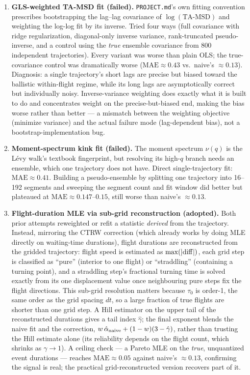 \documentclass[11pt]{article}
\newcommand{\code}[1]{\texttt{#1}}
\begin{document}
\begin{enumerate}
\item \textbf{GLS-weighted TA-MSD fit (failed).} \code{PROJECT.md}'s own
  fitting convention prescribes bootstrapping the lag--lag covariance of
  $\log(\mathrm{TA\text{-}MSD})$ and weighting the log-log fit by its inverse.
  Tried four ways (full covariance with ridge regularization, diagonal-only
  inverse variance, rank-truncated pseudo-inverse, and a control using the
  \emph{true} ensemble covariance from 800 independent trajectories). Every
  variant was worse than plain OLS; the true-covariance control was
  dramatically worse ($\mathrm{MAE}\approx 0.43$ vs.\ naive's
  $\approx 0.13$). Diagnosis: a single trajectory's short lags are precise but
  biased toward the ballistic within-flight regime, while its long lags are
  asymptotically correct but individually noisy. Inverse-variance weighting
  does exactly what it is built to do and concentrates weight on the
  precise-but-biased end, making the bias worse rather than better --- a
  mismatch between the weighting objective (minimize variance) and the actual
  failure mode (lag-dependent bias), not a bootstrap-implementation bug.
\item \textbf{Moment-spectrum kink fit (failed).} The moment spectrum
  $\nu(q)$ is the L\'evy walk's textbook fingerprint, but resolving its
  high-$q$ branch needs an ensemble, which one trajectory does not have.
  Direct single-trajectory fit: $\mathrm{MAE}\approx 0.41$. Building a
  pseudo-ensemble by splitting one trajectory into 16--192 segments and
  sweeping the segment count and fit window did better but plateaued at
  $\mathrm{MAE}\approx 0.147$--$0.15$, still worse than naive's $\approx 0.13$.
\item \textbf{Flight-duration MLE via sub-grid reconstruction (adopted).}
  Both prior attempts reweighted or refit a statistic \emph{derived} from the
  trajectory. Instead, mirroring the CTRW correction (which already works by
  doing MLE directly on waiting-time durations), flight durations are
  reconstructed from the gridded trajectory: flight speed is estimated as
  $\max(|{\rm diff}|)$, each grid step is classified as ``pure'' (interior to
  one flight) or ``straddling'' (containing a turning point), and a
  straddling step's fractional turning time is solved exactly from its one
  displacement value once neighbouring pure steps fix the flight directions.
  This sub-grid resolution matters because $\tau_0$ is order-1, the same
  order as the grid spacing $dt$, so a large fraction of true flights are
  shorter than one grid step. A Hill estimator on the upper tail of the
  reconstructed durations gives a tail index $\hat\gamma$; the final
  exponent blends the naive fit and the correction,
  $w\,\hat\alpha_{\rm naive} + (1-w)(3-\hat\gamma)$, rather than trusting the
  Hill estimate alone (its reliability depends on the flight count, which
  shrinks as $\gamma\to1$). A ceiling check --- a Pareto MLE on the
  \emph{true}, unquantized event durations --- reaches $\mathrm{MAE}\approx
  0.05$ against naive's $\approx 0.13$, confirming the signal is real; the
  practical grid-reconstructed version recovers part of it.
\end{enumerate}
\end{document}
